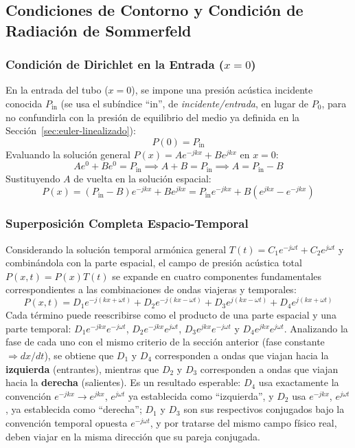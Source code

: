 \documentclass[11pt,letterpaper]{article}
\begin{document}
\subsection{Condiciones de Contorno y Condición de Radiación de Sommerfeld}

\subsubsection{Condición de Dirichlet en la Entrada ($x = 0$)}
En la entrada del tubo ($x = 0$), se impone una presión acústica incidente conocida $P_{\text{in}}$ (se usa el subíndice ``in'', de \textit{incidente/entrada}, en lugar de $P_0$, para no confundirla con la presión de equilibrio del medio ya definida en la Sección~\ref{sec:euler-linealizado}):
\begin{equation}
    P(0) = P_{\text{in}}
\end{equation}
Evaluando la solución general $P(x) = A e^{-jkx} + B e^{jkx}$ en $x = 0$:
\begin{equation}
    A e^0 + B e^0 = P_{\text{in}} \implies A + B = P_{\text{in}} \implies A = P_{\text{in}} - B
\end{equation}
Sustituyendo $A$ de vuelta en la solución espacial:
\begin{equation}
    P(x) = (P_{\text{in}} - B) e^{-jkx} + B e^{jkx} = P_{\text{in}} e^{-jkx} + B(e^{jkx} - e^{-jkx})
\end{equation}

\subsubsection{Superposición Completa Espacio-Temporal}
Considerando la solución temporal armónica general $T(t) = C_1 e^{-j\omega t} + C_2 e^{j\omega t}$ y combinándola con la parte espacial, el campo de presión acústica total $P(x,t) = P(x)T(t)$ se expande en cuatro componentes fundamentales correspondientes a las combinaciones de ondas viajeras y temporales:
\begin{equation}
    P(x,t) = D_1 e^{-j(kx + \omega t)} + D_2 e^{-j(kx - \omega t)} + D_3 e^{j(kx - \omega t)} + D_4 e^{j(kx + \omega t)}
\end{equation}
Cada término puede reescribirse como el producto de una parte espacial y una parte temporal: $D_1 e^{-jkx}e^{-j\omega t}$, $D_2 e^{-jkx}e^{j\omega t}$, $D_3 e^{jkx}e^{-j\omega t}$ y $D_4 e^{jkx}e^{j\omega t}$. Analizando la fase de cada uno con el mismo criterio de la sección anterior (fase constante $\Rightarrow dx/dt$), se obtiene que $D_1$ y $D_4$ corresponden a ondas que viajan hacia la \textbf{izquierda} (entrantes), mientras que $D_2$ y $D_3$ corresponden a ondas que viajan hacia la \textbf{derecha} (salientes). Es un resultado esperable: $D_4$ usa exactamente la convención $e^{-jkx}\to e^{jkx}$, $e^{j\omega t}$ ya establecida como ``izquierda'', y $D_2$ usa $e^{-jkx}$, $e^{j\omega t}$, ya establecida como ``derecha''; $D_1$ y $D_3$ son sus respectivos conjugados bajo la convención temporal opuesta $e^{-j\omega t}$, y por tratarse del mismo campo físico real, deben viajar en la misma dirección que su pareja conjugada.
\end{document}
